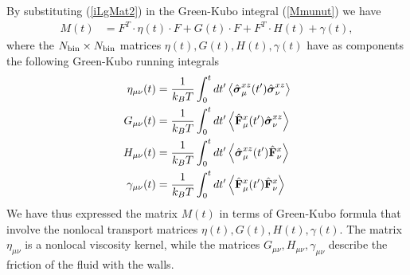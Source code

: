 \documentclass[b5paper,openright,10pt]{book}
\newcommand{\esc}{\!\cdot\!}
\begin{document}
By   substituting
(\ref{iLgMat2}) in the Green-Kubo integral (\ref{Mmunut}) we have
\begin{align}
{M}(t)&=F^T\esc{\eta}(t)\esc F+{G}(t)\esc F+F^T\esc{H}(t)+{\gamma}(t),
\label{MMatrix1}
\end{align}
where the  $N_{\rm bin}\times N_{\rm bin}$  matrices ${\eta}(t),{G}(t),{H}(t),{\gamma}(t)$
have as components the following Green-Kubo running integrals
\begin{align}
\eta_{\mu\nu}(t)
&=\frac{1}{k_BT}\int_0^t dt'
\left\langle \hat{\boldsymbol{\sigma}}^{xz}_{\mu}(t')\hat{\boldsymbol{\sigma}}^{xz}_{\nu}
\right\rangle
\nonumber\\
  G_{\mu\nu}(t)&=\frac{1}{k_BT}\int_0^t dt'
\left\langle\hat{\bf F}^x_\mu(t')
\hat{\boldsymbol{\sigma}}^{xz}_\nu
\right\rangle
\nonumber\\
H_{\mu\nu}(t)&=
\frac{1}{k_BT}\int_0^t dt'
\left\langle\hat{\boldsymbol{\sigma}}^{xz}_\mu(t')\hat{\bf F}^{x}_\nu\right\rangle
\nonumber\\
  \gamma_{\mu\nu}(t)
&=\frac{1}{k_BT}\int_0^t dt'
\left\langle 
\hat{\bf F}^{x}_\mu(t')
\hat{\bf F}^{x}_\nu\right\rangle
\label{GK}
\end{align}
We  have thus  expressed  the  matrix $M(t)$  in  terms of  Green-Kubo
formula    that   involve    the    nonlocal   transport    matrices
$\eta(t),G(t),H(t),\gamma(t)$.   The  matrix   $\eta_{\mu\nu}$  is   a
nonlocal      viscosity      kernel,     while      the      matrices
$G_{\mu\nu},H_{\mu\nu},\gamma_{\mu\nu}$ describe  the friction  of the
fluid with the walls.
\end{document}
